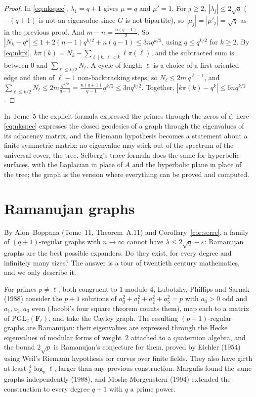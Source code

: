 \begin{proof}
In \eqref{eq:nkspec}, $\lambda_1=q+1$ gives $\mu=q$ and $\mu'=1$. For $j\ge2$, $|\lambda_j|\le2\sqrt q$ ($-(q+1)$ is not an eigenvalue since $G$ is not bipartite), so $|\mu_j|=|\mu'_j|=\sqrt q$ as in the previous proof. And
$m-n=\frac{n(q-1)}2$. So $|N_k-q^k|\le1+2(n-1)q^{k/2}+n(q-1)\le3nq^{k/2}$, using $q\le q^{k/2}$ for $k\ge2$. By \eqref{eq:nkpi}, $k\pi(k)=N_k-\sum_{\ell\mid k,\,\ell<k}\ell\pi(\ell)$, and the subtracted sum is between $0$ and
$\sum_{\ell\le k/2}N_\ell$. A cycle of length $\ell$ is a choice of a first oriented edge and then of $\ell-1$ non-backtracking steps, so $N_\ell\le2m\,q^{\ell-1}$, and
$\sum_{\ell\le k/2}N_\ell\le2m\frac{q^{k/2}}{q-1}=\frac{n(q+1)}{q-1}q^{k/2}\le3nq^{k/2}$. Together, $|k\pi(k)-q^k|\le6nq^{k/2}$.
\end{proof}

\begin{beauty}
In Tome~5 the explicit formula expressed the primes through the zeros of $\zeta$; here \eqref{eq:nkspec} expresses the closed geodesics of a graph through the eigenvalues of its adjacency matrix, and the Riemann hypothesis
becomes a statement about a finite symmetric matrix: no eigenvalue may stick out of the spectrum of the universal cover, the tree. Selberg's trace formula does the same for hyperbolic surfaces, with the Laplacian
in place of $A$ and the hyperbolic plane in place of the tree; the graph is the version where everything can be proved and computed.
\end{beauty}

\section{Ramanujan graphs}

By Alon--Boppana (Tome~11, Theorem~A.11) and Corollary~\ref{cor:serre}, a family of $(q+1)$-regular graphs with $n\to\infty$ cannot have $\lambda\le2\sqrt q-\varepsilon$: Ramanujan graphs are the best possible expanders. Do they exist,
for every degree and infinitely many sizes? The answer is a tour of twentieth century mathematics, and we only describe it.

\begin{remark}
For primes $p\ne\ell$, both congruent to $1$ modulo $4$, Lubotzky, Phillips and Sarnak (1988) consider the $p+1$ solutions of $a_0^2+a_1^2+a_2^2+a_3^2=p$ with $a_0>0$ odd and $a_1,a_2,a_3$ even (Jacobi's four square theorem counts them),
map each to a matrix of $\mathrm{PGL}_2(\mathbf F_\ell)$, and take the Cayley graph. The resulting $(p+1)$-regular graphs are Ramanujan: their eigenvalues are expressed through the Hecke eigenvalues of modular forms of
weight~$2$ attached to a quaternion algebra, and the bound $2\sqrt p$ is Ramanujan's conjecture for them, proved by Eichler (1954) using Weil's Riemann hypothesis for curves over finite fields. They also have girth at
least $\frac43\log_p\ell$, larger than any previous construction. Margulis found the same graphs independently (1988), and Moshe Morgenstern (1994) extended the construction to every degree $q+1$ with $q$ a prime power.
\end{remark}

